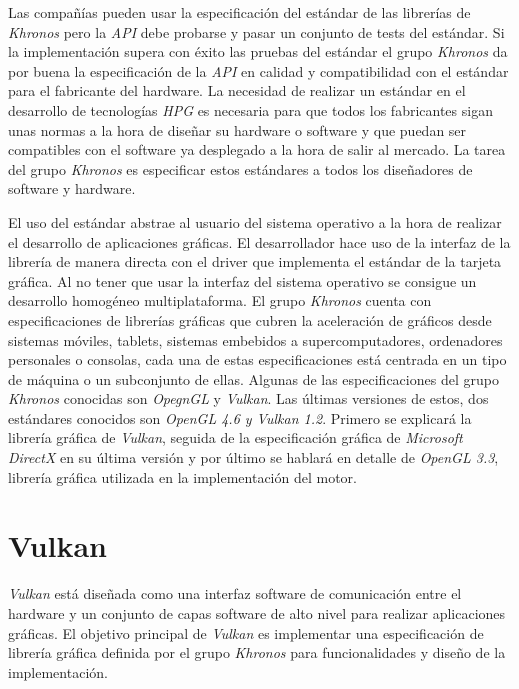 \documentclass[a4paper]{book}
\begin{document}
Las compañías pueden usar la especificación del estándar de las librerías de \textit{Khronos} pero la \textit{API} debe probarse y pasar un
conjunto de tests del estándar. Si la implementación supera con éxito las pruebas del estándar el grupo \textit{Khronos} da por
buena la especificación de la \textit{API} en calidad y compatibilidad con el estándar para el fabricante del hardware.
La necesidad de realizar un estándar en el desarrollo de tecnologías \textit{HPG} es necesaria para que todos los fabricantes
sigan unas normas a la hora de diseñar su hardware o software y que puedan ser compatibles con el software ya desplegado a la
hora de salir al mercado. La tarea del grupo \textit{Khronos} es especificar estos estándares a todos los diseñadores de software y hardware.

El uso del estándar abstrae al usuario del sistema operativo a la hora de realizar el desarrollo de aplicaciones gráficas. El desarrollador 
hace uso de la interfaz de la librería de manera directa con el driver que implementa el estándar de la tarjeta gráfica. Al no tener que 
usar la interfaz del sistema operativo se consigue un desarrollo homogéneo multiplataforma. El grupo \textit{Khronos} cuenta con
especificaciones de librerías gráficas que cubren la aceleración de gráficos desde sistemas móviles, tablets, sistemas embebidos a
supercomputadores, ordenadores personales o consolas, cada una de estas especificaciones está centrada en un tipo de máquina o un subconjunto
de ellas. Algunas de las especificaciones del grupo \textit{Khronos} conocidas son \textit{OpegnGL} y \textit{Vulkan}. Las últimas versiones
de estos, dos estándares conocidos son \textit{OpenGL 4.6 y \textit{Vulkan} 1.2}. Primero se explicará la librería gráfica de \textit{Vulkan},
seguida de la especificación gráfica de \textit{Microsoft DirectX} en su última versión y por último se hablará en detalle
de \textit{OpenGL 3.3}, librería gráfica utilizada en la implementación del motor.

\section{Vulkan}
\label{sec:Vulkan}

\textit{Vulkan} está diseñada como una interfaz software de comunicación entre el hardware y un conjunto de capas software
de alto nivel para realizar aplicaciones gráficas. El objetivo principal de \textit{Vulkan} es implementar una especificación
de librería gráfica definida por el grupo \textit{Khronos} para funcionalidades y diseño de la implementación. \cite{book:_vulkan}
\end{document}
